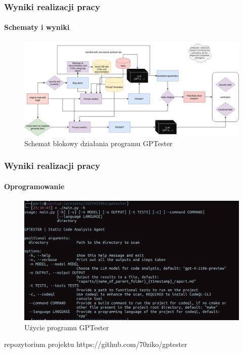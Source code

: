 \documentclass[lualatex,aspectratio=54,12pt,]{beamer}
\begin{document}
\begin{frame}
      \frametitle{Wyniki realizacji pracy}
      \framesubtitle{Schematy i wyniki}
      \begin{figure}
            \centering
            \includegraphics[width=0.9\linewidth]{gptester.drawio.png}
            \caption{Schemat blokowy działania programu GPTester}
      \end{figure}

\end{frame}

\begin{frame}
      \frametitle{Wyniki realizacji pracy}
      \framesubtitle{Oprogramowanie}
      \begin{figure}
            \centering
            \includegraphics[width=0.6
            \linewidth]{gptester-h.png}
            \caption{Użycie programu GPTester}
      \end{figure}

      \begin{block}{repozytorium projektu}
            https://github.com/70ziko/gptester
      \end{block}
\end{frame}
\end{document}
